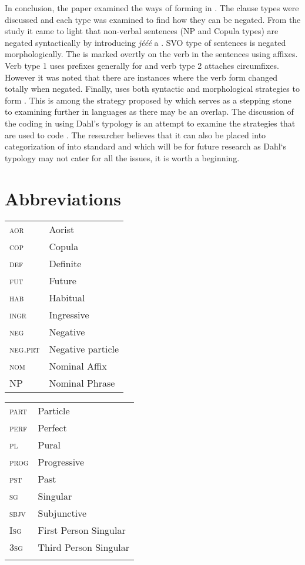 \documentclass[output=paper
,newtxmath
,modfonts
,nonflat]{langsci/langscibook}
\begin{document}
In conclusion, the paper examined the ways of forming  in . The clause types were discussed and each type was examined to find how they can be negated. From the study it came to light that non-verbal sentences (NP and Copula types) are negated syntactically by introducing \textit{j\'e\'e\'e} a . SVO type of sentences is negated morphologically. The  is marked overtly on the verb in the sentences using affixes. Verb type 1 uses prefixes generally for  and verb type 2 attaches circumfixes. However it was noted that there are instances where the verb form changed totally when negated. Finally,  uses both syntactic and morphological strategies to form . This is among the strategy proposed by \citet{dahl1979typology} which serves as a stepping stone to examining  further in  languages as there may be an overlap. The discussion of the  coding in  using Dahl’s typology is an attempt to examine the strategies that are used to code . The researcher believes that it can also be placed into \citet{Miestamo2007} categorization of  into standard and  which will be for future research as Dahl‘s typology may not cater for all the issues, it is worth a beginning.

\section*{Abbreviations}

\begin{tabularx}{.45\textwidth}{lQ}
\textsc{aor} & Aorist \\
\textsc{cop} & Copula\\
 \textsc{def}&  Definite\\
 \textsc{fut}&  Future\\
 \textsc{hab}&  Habitual\\
\textsc{ingr}&  Ingressive\\
\textsc{neg}&  Negative \\
\textsc{neg.prt} &  Negative particle\\
 \textsc{nom} & Nominal Affix\\
 NP &  Nominal Phrase\\
\end{tabularx}
\begin{tabularx}{.45\textwidth}{lQ}
 \textsc{part} & Particle\\
 \textsc{perf}&  Perfect\\
 \textsc{pl}&  Pural\\
 \textsc{prog}&  Progressive\\
 \textsc{pst} & Past\\
 \textsc{sg} & Singular\\
 \textsc{sbjv} & Subjunctive\\
 I\textsc{sg}&  First Person Singular\\
 3\textsc{sg}&  Third Person Singular\\
 \\
 
\end{tabularx}
\end{document}
